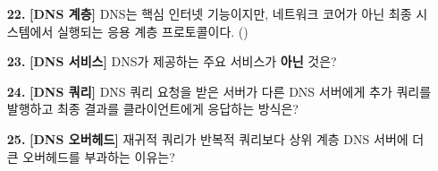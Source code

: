 \documentclass[a4paper, 10pt]{article}
\newcommand{\sectionbox}[1]{
  \vspace{0.5em}
  \noindent\fbox{\textbf{#1}}
  \vspace{0.5em}
}
\begin{document}
\begin{enumerate}[itemsep=3em, leftmargin=2em, label={}]




\item[] \sectionbox{IV. DNS}



\item[\textbf{22.}] \textbf{[DNS 계층]} DNS는 핵심 인터넷 기능이지만, 네트워크 코어가 아닌 최종 시스템에서 실행되는 응용 계층 프로토콜이다. (\hspace{1cm})



\item[\textbf{23.}] \textbf{[DNS 서비스]} DNS가 제공하는 주요 서비스가 \textbf{아닌} 것은?






\item[\textbf{24.}] \textbf{[DNS 쿼리]} DNS 쿼리 요청을 받은 서버가 다른 DNS 서버에게 추가 쿼리를 발행하고 최종 결과를 클라이언트에게 응답하는 방식은?






\item[\textbf{25.}] \textbf{[DNS 오버헤드]} 재귀적 쿼리가 반복적 쿼리보다 상위 계층 DNS 서버에 더 큰 오버헤드를 부과하는 이유는?




\end{enumerate}
\end{document}
